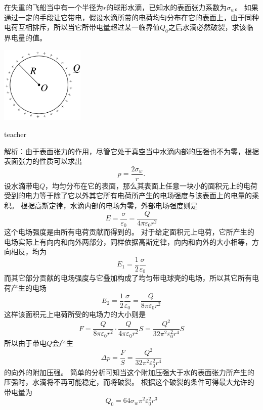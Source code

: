 \begin{example}
在失重的飞船当中有一个半径为$r$的球形水滴，已知水的表面张力系数为$\sigma_w$。
如果通过一定的手段让它带电，假设水滴所带的电荷均匀分布在它的表面上，由于同种电荷互相排斥，所以当它所带电量超过某一临界值$Q_0$之后水滴必然破裂，求该临界电量的值。
\begin{flushright}
\includegraphics[width=0.3\textwidth]{images/elec-problem-5.pdf}
\end{flushright}
\begin{taggedblock}{teacher}

解析：由于表面张力的作用，尽管它处于真空当中水滴内部的压强也不为零，根据表面张力的性质可以求出
\[
p=\frac{2\sigma_w}{r}.
\]
设水滴带电$Q$，均匀分布在它的表面，那么其表面上任意一块小的面积元上的电荷受到的电力等于除了它以外其它所有电荷所产生的电场强度与该表面上的电量的乘积。
根据高斯定律，水滴内部的电场为零，外部电场强度则是
\[
E=\frac{\sigma}{\varepsilon_0}=\frac{Q}{4\pi\varepsilon_0 r^2}
\]
这个电场强度是由所有电荷贡献而得到的。
对于给定面积元上电荷，它所产生的电场实际上有向内和向外两部分，同样依据高斯定律，向内和向外的大小相等，方向相反，均为
\[
E_1 = \frac{1}{2}\frac{\sigma}{\varepsilon_0}
\]
而其它部分贡献的电场强度与它叠加构成了均匀带电球壳的电场，所以其它所有电荷产生的电场
\[
E_2 =  \frac{1}{2}\frac{\sigma}{\varepsilon_0} = \frac{Q}{8\pi\varepsilon_0 r^2}
\]
这样该面积元上电荷所受的电场力的大小则是
\[
F = \frac{Q}{8\pi\varepsilon_0 r^2}\cdot \frac{Q}{4\pi\varepsilon_0 r^2}S = \frac{Q^2}{32\pi^2\varepsilon_0^2r^4}S 
\]
所以由于带电$Q$会产生
\[
\Delta p = \frac{F}{S} = \frac{Q^2}{32\pi^2\varepsilon_0^2r^4}
\]
的向外的附加压强。
简单的分析可知当这个附加压强大于水的表面张力所产生的压强时，水滴将不再可能稳定，而将破裂。
根据这个破裂的条件可得最大允许的带电量为
\[
Q_0=64\sigma_w\pi^2\varepsilon_0^2r^3
\]
\end{taggedblock}
\end{example}

